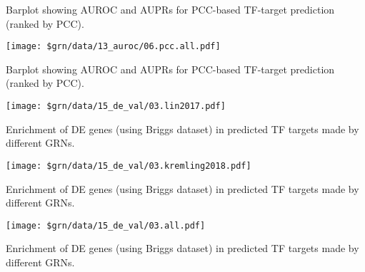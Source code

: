 \documentclass[11pt,]{article}
\let\origfigure\figure
\let\endorigfigure\endfigure
\renewenvironment{figure}[1][2] {
    \expandafter\origfigure\expandafter[H]
} {
    \endorigfigure
}
\begin{document}
Barplot showing AUROC and AUPRs for PCC-based TF-target prediction
(ranked by PCC).

\pagebreak

\begin{figure}
\centering
\texttt{[image: \$grn/data/13\_auroc/06.pcc.all.pdf]}
\caption{Fig 7}
\end{figure}

Barplot showing AUROC and AUPRs for PCC-based TF-target prediction
(ranked by PCC).

\pagebreak

\begin{figure}
\centering
\texttt{[image: \$grn/data/15\_de\_val/03.lin2017.pdf]}
\caption{Fig 8}
\end{figure}

Enrichment of DE genes (using Briggs dataset) in predicted TF targets
made by different GRNs.

\pagebreak

\begin{figure}
\centering
\texttt{[image: \$grn/data/15\_de\_val/03.kremling2018.pdf]}
\caption{Fig 9}
\end{figure}

Enrichment of DE genes (using Briggs dataset) in predicted TF targets
made by different GRNs.

\pagebreak

\begin{figure}
\centering
\texttt{[image: \$grn/data/15\_de\_val/03.all.pdf]}
\caption{Fig 10}
\end{figure}

Enrichment of DE genes (using Briggs dataset) in predicted TF targets
made by different GRNs.
\newpage
\singlespacing 
\end{document}

